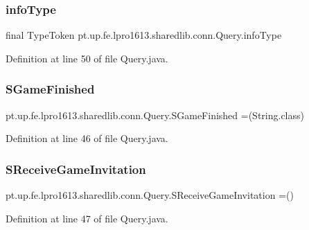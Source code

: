 \subsubsection{\texorpdfstring{info\+Type}{infoType}}
{\footnotesize\ttfamily final Type\+Token pt.\+up.\+fe.\+lpro1613.\+sharedlib.\+conn.\+Query.\+info\+Type}



Definition at line 50 of file Query.\+java.

\hypertarget{enumpt_1_1up_1_1fe_1_1lpro1613_1_1sharedlib_1_1conn_1_1_query_aca594101e00b7d1c778971dbc57ef432}{}\label{enumpt_1_1up_1_1fe_1_1lpro1613_1_1sharedlib_1_1conn_1_1_query_aca594101e00b7d1c778971dbc57ef432} 
\subsubsection{\texorpdfstring{S\+Game\+Finished}{SGameFinished}}
{\footnotesize\ttfamily pt.\+up.\+fe.\+lpro1613.\+sharedlib.\+conn.\+Query.\+S\+Game\+Finished =(String.\+class)}



Definition at line 46 of file Query.\+java.

\hypertarget{enumpt_1_1up_1_1fe_1_1lpro1613_1_1sharedlib_1_1conn_1_1_query_ac7b851d120b1903b63a14053166ca2a8}{}\label{enumpt_1_1up_1_1fe_1_1lpro1613_1_1sharedlib_1_1conn_1_1_query_ac7b851d120b1903b63a14053166ca2a8} 
\subsubsection{\texorpdfstring{S\+Receive\+Game\+Invitation}{SReceiveGameInvitation}}
{\footnotesize\ttfamily pt.\+up.\+fe.\+lpro1613.\+sharedlib.\+conn.\+Query.\+S\+Receive\+Game\+Invitation =()}



Definition at line 47 of file Query.\+java.

